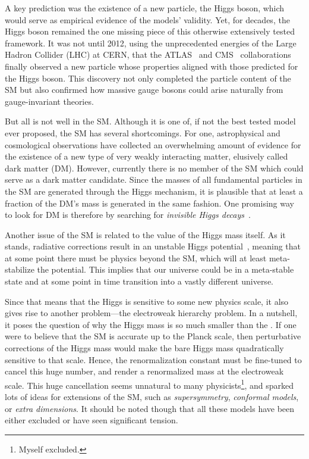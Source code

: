 A key prediction was the existence of a new particle, the Higgs boson, which would serve as empirical evidence of the models' validity. Yet, for decades, the Higgs boson remained the one missing piece of this otherwise extensively tested framework. It was not until 2012, using the unprecedented energies of the Large Hadron Collider (\acs{LHC}) at CERN, that the ATLAS~\cite{ATLAS:2012yve} and CMS~\cite{CMS:2012qbp} collaborations finally observed a new particle whose properties aligned with those predicted for the Higgs boson. This discovery not only completed the particle content of the \acs{SM} but also confirmed how massive gauge bosons could arise naturally from gauge-invariant theories.

But all is not well in the \acs{SM}. Although it is one of, if not the best tested model ever proposed, the \acs{SM} has several shortcomings. For one, astrophysical and cosmological observations have collected an overwhelming amount of evidence for the existence of a new type of very weakly interacting matter, elusively called dark matter (\acs{DM}). However, currently there is no member of the \acs{SM} which could serve as a dark matter candidate. Since the masses of all fundamental particles in the \acs{SM} are generated through the Higgs mechanism, it is plausible that at least a fraction of the \acs{DM}'s mass is generated in the same fashion. One promising way to look for \acs{DM} is therefore by searching for \textit{invisible Higgs decays}~\cite{ATLAS:2017nyv, CMS:2016dhk}.

Another issue of the \acs{SM} is related to the value of the Higgs mass itself. As it stands, radiative corrections result in an unstable Higgs potential~\cite{Degrassi:2012ry}, meaning that at some point there must be physics beyond the \acs{SM}, which will at least meta-stabilize the potential. This implies that our universe could be in a meta-stable state and at some point in time transition into a vastly different universe.

Since that means that the Higgs is sensitive to some new physics scale, it also gives rise to another problem---the electroweak hierarchy problem. In a nutshell, it poses the question of why the Higgs mass is so much smaller than the . If one were to believe that the \acs{SM} is accurate up to the Planck scale, then perturbative corrections of the Higgs mass would make the bare Higgs mass quadratically sensitive to that scale. Hence, the renormalization constant must be fine-tuned to cancel this huge number, and render a renormalized mass at the electroweak scale. This huge cancellation seems unnatural to many physicists\footnote{Myself excluded.}, and sparked lots of ideas for extensions of the \acs{SM}, such as \textit{supersymmetry}, \textit{conformal models}, or \textit{extra dimensions}. It should be noted though that all these models have been either excluded or have seen significant tension.

